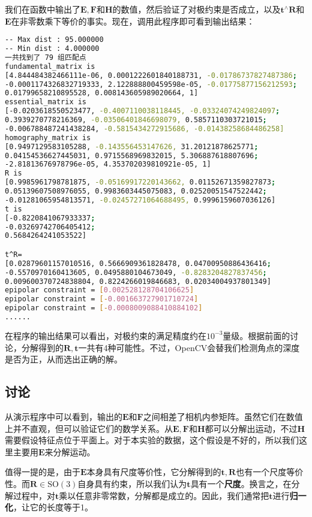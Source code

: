 我们在函数中输出了$\bm{E}, \bm{F}$和$\bm{H}$的数值，然后验证了对极约束是否成立，以及$\bm{t}^\wedge \bm{R}$和$\bm{E}$在非零数乘下等价的事实。现在，调用此程序即可看到输出结果：
\begin{lstlisting}[language=sh,caption=终端输入：]
% build/pose_estimation_2d2d 1.png 2.png
-- Max dist : 95.000000 
-- Min dist : 4.000000 
一共找到了 79 组匹配点
fundamental_matrix is 
[4.844484382466111e-06, 0.0001222601840188731, -0.01786737827487386;
-0.0001174326832719333, 2.122888800459598e-05, -0.01775877156212593;
0.01799658210895528, 0.008143605989020664, 1]
essential_matrix is 
[-0.0203618550523477, -0.4007110038118445, -0.03324074249824097;
0.3939270778216369, -0.03506401846698079, 0.5857110303721015;
-0.006788487241438284, -0.5815434272915686, -0.01438258684486258]
homography_matrix is 
[0.9497129583105288, -0.143556453147626, 31.20121878625771;
0.04154536627445031, 0.9715568969832015, 5.306887618807696;
-2.81813676978796e-05, 4.353702039810921e-05, 1]
R is 
[0.9985961798781875, -0.05169917220143662, 0.01152671359827873;
0.05139607508976055, 0.9983603445075083, 0.02520051547522442;
-0.01281065954813571, -0.02457271064688495, 0.9996159607036126]
t is 
[-0.8220841067933337;
-0.03269742706405412;
0.5684264241053522]

t^R=
[0.02879601157010516, 0.5666909361828478, 0.04700950886436416;
-0.5570970160413605, 0.0495880104673049, -0.8283204827837456;
0.009600370724838804, 0.8224266019846683, 0.02034004937801349]
epipolar constraint = [0.002528128704106625]
epipolar constraint = [-0.001663727901710724]
epipolar constraint = [-0.0008009088410884102]
......
\end{lstlisting}

在程序的输出结果可以看出，对极约束的满足精度约在$10 ^{-3}$量级。根据前面的讨论，分解得到的$\bm{R}, \bm{t}$一共有4种可能性。不过，OpenCV会替我们检测角点的深度是否为正，从而选出正确的解。

\subsection*{讨论}
从演示程序中可以看到，输出的$\bm{E}$和$\bm{F}$之间相差了相机内参矩阵。虽然它们在数值上并不直观，但可以验证它们的数学关系。从$\bm{E}, \bm{F}$和$\bm{H}$都可以分解出运动，不过$\bm{H}$需要假设特征点位于平面上。对于本实验的数据，这个假设是不好的，所以我们这里主要用$\bm{E}$来分解运动。

值得一提的是，由于$\bm{E}$本身具有尺度等价性，它分解得到的$\bm{t}, \bm{R}$也有一个尺度等价性。而$\bm{R} \in \mathrm{SO}(3)$自身具有约束，所以我们认为$\bm{t}$具有一个\textbf{尺度}。换言之，在分解过程中，对$\bm{t}$乘以任意非零常数，分解都是成立的。因此，我们通常把$\bm{t}$进行\textbf{归一化}，让它的长度等于1。

